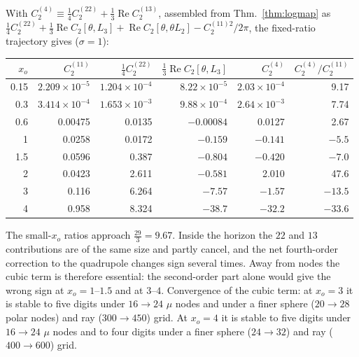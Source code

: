 With $C^{(4)}_2\equiv\frac14C^{(22)}_2+\frac13\operatorname{Re}C^{(13)}_2$, assembled from
Thm.~\ref{thm:logmap} as
$\frac14C^{(22)}_2+\frac13\operatorname{Re}C_2[\theta,L_3]+\operatorname{Re}C_2[\theta,\theta L_2]-C_2^{(11)2}/2\pi$,
the fixed-ratio trajectory gives ($\sigma=1$):
\begin{center}
\begin{tabular}{rrrrrr}
\toprule
$x_o$ & $C_2^{(11)}$ & $\frac14C_2^{(22)}$ & $\frac13\operatorname{Re}C_2[\theta,L_3]$ & $C^{(4)}_2$ & $C^{(4)}_2/C^{(11)}_2$\\\midrule
0.15 & $2.209\times10^{-5}$ & $1.204\times10^{-4}$ & $8.22\times10^{-5}$ & $2.03\times10^{-4}$ & 9.17\\
0.3  & $3.414\times10^{-4}$ & $1.653\times10^{-3}$ & $9.88\times10^{-4}$ & $2.64\times10^{-3}$ & 7.74\\
0.6  & 0.00475 & 0.0135 & $-0.00084$ & 0.0127 & 2.67\\
1    & 0.0258  & 0.0172 & $-0.159$   & $-0.141$ & $-5.5$\\
1.5  & 0.0596  & 0.387  & $-0.804$   & $-0.420$ & $-7.0$\\
2    & 0.0423  & 2.611  & $-0.581$   & 2.010    & 47.6\\
3    & 0.116   & 6.264  & $-7.57$    & $-1.57$  & $-13.5$\\
4    & 0.958   & 8.324  & $-38.7$    & $-32.2$  & $-33.6$\\
\bottomrule
\end{tabular}
\end{center}
The small-$x_o$ ratios approach $\frac{29}3=9.67$. Inside the horizon the $22$ and $13$
contributions are of the same size and partly cancel, and the net fourth-order correction to
the quadrupole changes sign several times. Away from nodes the cubic term is therefore
essential: the second-order part alone would give the wrong sign
at $x_o=1$--$1.5$ and at $3$--$4$. Convergence of the cubic term: at $x_o=3$ it is stable to five
digits under $16\to24$ $\mu$ nodes and under a finer sphere ($20\to28$ polar nodes) and ray
($300\to450$) grid. At $x_o=4$ it is stable to five digits under $16\to24$ $\mu$ nodes and to
four digits under a finer sphere ($24\to32$) and ray ($400\to600$) grid.

